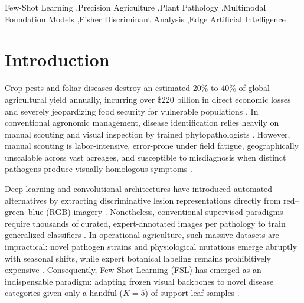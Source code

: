 \documentclass[preprint,12pt]{elsarticle}
\begin{document}
\begin{frontmatter}
\begin{keyword}
Few-Shot Learning \sep Precision Agriculture \sep Plant Pathology \sep Multimodal Foundation Models \sep Fisher Discriminant Analysis \sep Edge Artificial Intelligence
\end{keyword}

\end{frontmatter}

\section{Introduction}
\label{sec:introduction}
Crop pests and foliar diseases destroy an estimated 20\% to 40\% of global agricultural yield annually, incurring over \$220 billion in direct economic losses and severely jeopardizing food security for vulnerable populations \cite{richard2022control}. In conventional agronomic management, disease identification relies heavily on manual scouting and visual inspection by trained phytopathologists \cite{shoaib2023advanced}. However, manual scouting is labor-intensive, error-prone under field fatigue, geographically unscalable across vast acreages, and susceptible to misdiagnosis when distinct pathogens produce visually homologous symptoms \cite{shoaib2023advanced}.

Deep learning and convolutional architectures have introduced automated alternatives by extracting discriminative lesion representations directly from red--green--blue (RGB) imagery \cite{shoaib2023advanced}. Nonetheless, conventional supervised paradigms require thousands of curated, expert-annotated images per pathology to train generalized classifiers \cite{shafik2023systematic}. In operational agriculture, such massive datasets are impractical: novel pathogen strains and physiological mutations emerge abruptly with seasonal shifts, while expert botanical labeling remains prohibitively expensive \cite{sun2024few}. Consequently, Few-Shot Learning (FSL) has emerged as an indispensable paradigm: adapting frozen visual backbones to novel disease categories given only a handful ($K=5$) of support leaf samples \cite{snell2017prototypical, sun2024few}.
\end{document}
